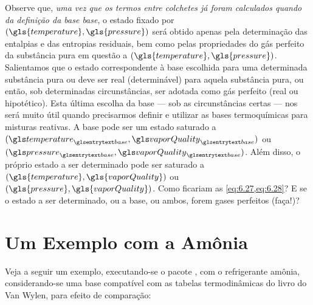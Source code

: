     Observe que, \emph{uma vez que os termos entre colchetes já foram
    calculados quando da definição da base \gls{base}}, o estado fixado por
    $(\gls{temperature},\gls{pressure})$ será obtido apenas pela determinação
    das entalpias e das entropias residuais, bem como pelas propriedades do gás
    perfeito da substância pura em questão a
    $(\gls{temperature},\gls{pressure})$. Salientamos que o estado
    correspondente à base escolhida para uma determinada substância pura ou
    deve ser real (determinável) para aquela substância pura, ou então, sob
    determinadas circunstâncias, ser adotada como gás perfeito (real ou
    hipotético). Esta última escolha da base --- sob as circunstâncias certas
    --- nos será muito útil quando precisarmos definir e utilizar as bases
    termoquímicas para misturas reativas. A base pode ser um estado saturado a
    $(\gsub{temperature}{base},\gsub{vaporQuality}{base})$ ou
    $(\gsub{pressure}{base},\gsub{vaporQuality}{base})$. Além disso, o próprio
    estado a ser determinado pode ser saturado a
    $(\gls{temperature},\gls{vaporQuality})$ ou
    $(\gls{pressure},\gls{vaporQuality})$. Como ficariam as
    \cref{eq:6.27,eq:6.28}? E se o estado a ser determinado, ou a base, ou
    ambos, forem gases perfeitos (faça!)?


    \section{Um Exemplo com a Amônia}

    Veja a seguir um exemplo, executando-se o pacote ,
    com o refrigerante amônia, considerando-se uma base compatível com as
    tabelas termodinâmicas do livro do Van Wylen, para efeito de comparação:

